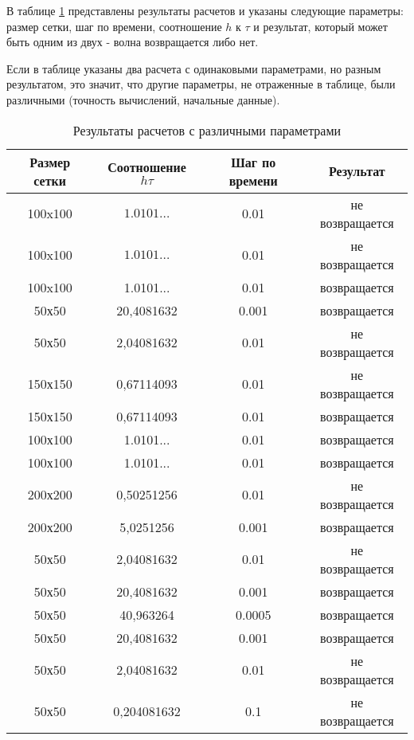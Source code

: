 В таблице \ref{tab:Variables} представлены результаты расчетов и указаны следующие параметры: размер сетки, шаг по времени, соотношение $h$ к $\tau$ и результат, который может быть одним из двух - волна возвращается либо нет.

Если в таблице указаны два расчета с одинаковыми параметрами, но разным результатом, это значит, что другие параметры, не отраженные в таблице, были различными (точность вычислений, начальные данные).

\begin{table}[p]
    \caption{Результаты расчетов с различными параметрами}
    \label{tab:Variables}
    \begin{center}
	\begin{tabular}{|c|c|c|c|}
	    \hline
	    Размер сетки & Соотношение $h \tau$ & Шаг по времени & Результат\\
	    \hline
	    100x100 & $1.0101\ldots$ & 0.01 & не возвращается\\
	    \hline
	    100x100 & $1.0101\ldots$ & 0.01 & не возвращается\\
	    \hline
	    100x100 & 1.0101... & 0.01 & возвращается\\
	    \hline
	    50х50 & 20,4081632 & 0.001 & возвращается\\
	    \hline
	    50х50 & 2,04081632 & 0.01 & не возвращается\\
	    \hline
	    150х150 & 0,67114093 & 0.01 & не возвращается\\
	    \hline
	    150х150 & 0,67114093 & 0.01 & возвращается\\
	    \hline
	    100х100 & 1.0101... & 0.01 & возвращается\\
	    \hline
	    100х100 & 1.0101... & 0.01 & возвращается\\
	    \hline
	    200х200 & 0,50251256 & 0.01 & не возвращается\\
	    \hline
	    200х200 & 5,0251256 & 0.001 & возвращается\\
	    \hline
	    50х50 & 2,04081632 & 0.01 & не возвращается\\
	    \hline
	    50х50 & 20,4081632 & 0.001 & возвращается\\
	    \hline
	    50х50 & 40,963264 & 0.0005 & возвращается\\
	    \hline
	    50х50 & 20,4081632 & 0.001 & возвращается\\
	    \hline
	    50х50 & 2,04081632 & 0.01 & не возвращается\\
	    \hline
	    50х50 & 0,204081632 & 0.1 & не возвращается\\

\end{tabular}
\end{center}
\end{table}
